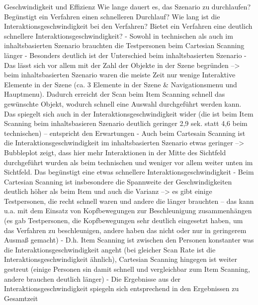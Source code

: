 Geschwindigkeit und Effizienz
Wie lange dauert es, das Szenario zu durchlaufen? Begünstigt ein Verfahren einen schnelleren Durchlauf? Wie lang ist die Interaktionsgeschwindigkeit bei den Verfahren? Bietet ein Verfahren eine deutlich schnellere Interaktionsgeschwindigkeit?
-	Sowohl in technischen als auch im inhaltsbasierten Szenario brauchten die Testpersonen beim Cartesian Scanning länger 
-	Besonders deutlich ist der Unterschied beim inhaltsbasierten Szenario 
-	Das lässt sich vor allem mit der Zahl der Objekte in der Szene begründen --> beim inhaltsbasierten Szenario waren die meiste Zeit nur wenige Interaktive Elemente in der Szene (ca. 3 Elemente in der Szene \& Navigationsmenu und Hauptmenu). Dadurch erreicht der Scan beim Item Scanning schnell das gewünschte Objekt, wodurch schnell eine Auswahl durchgeführt werden kann. Das spiegelt sich auch in der Interaktionsgeschwindigkeit wider (die ist beim Item Scanning beim inhaltsbasieren Szenario deutlich geringer 2,9 sek. statt 4,6 beim technischen) – entspricht den Erwartungen 
-	Auch beim Cartesain Scanning ist die Interaktionsgeschwindigkeit im inhaltsbasierten Szenario etwas geringer --> Bubbleplot zeigt, dass hier mehr Interaktionen in der Mitte des Sichtfeld durchgeführt wurden als beim technischen und weniger vor allem weiter unten im Sichtfeld. Das begünstigt eine etwas schnellere Interaktionsgeschwindigkeit 
-	Beim Cartesian Scanning ist insbesondere die Spannweite der Geschwindigkeiten deutlich höher als beim Item und auch die Varianz --> es gibt einige Testpersonen, die recht schnell waren und andere die länger brauchten – das kann u.a. mit dem Einsatz von Kopfbewegungen zur Beschleunigung zusammenhängen (es gab Testpersonen, die Kopfbewegungen sehr deutlich eingesetzt haben, um das Verfahren zu beschleunigen, andere haben das nicht oder nur in geringerem Ausmaß gemacht) 
-	D.h. Item Scanning ist zwischen den Personen konstanter was die Interaktionsgeschwindigkeit angeht (bei gleicher Scan Rate ist die Interaktionsgeschwindigkeit ähnlich), Cartesian Scanning hingegen ist weiter gestreut (einige Personen sin damit schnell und vergleichbar zum Item Scanning, andere brauchen deutlich länger)
-	Die Ergebnisse aus der Interaktionsgeschwindigkeit spiegeln sich entsprechend in den Ergebnissen zu Gesamtzeit 

